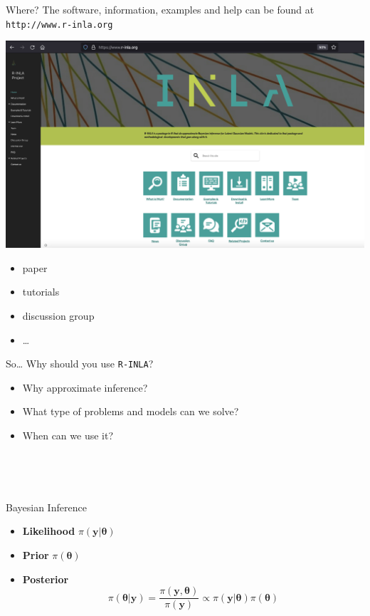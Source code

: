 \documentclass[
  ignorenonframetext,
]{beamer}
\providecommand{\tightlist}{%
  \setlength{\itemsep}{0pt}\setlength{\parskip}{0pt}}
\begin{document}
\begin{frame}[fragile]{Where?}
\protect\hypertarget{where}{}
The software, information, examples and help can be found at
\texttt{http://www.r-inla.org}

\begin{center}\includegraphics[width=0.5\linewidth]{graphics/rinla} \end{center}

\begin{itemize}
\tightlist
\item
  paper
\item
  tutorials
\item
  discussion group
\item
  \ldots{}
\end{itemize}
\end{frame}

\begin{frame}{So\ldots{} Why should you use \texttt{R-INLA}?}
\protect\hypertarget{so-why-should-you-use-r-inla}{}
\begin{itemize}
\tightlist
\item
  Why approximate inference?
\item
  What type of problems and models can we solve?
\item
  When can we use it?\\
  \strut \\
  \strut \\
\end{itemize}
\end{frame}

\begin{frame}{Bayesian Inference}
\protect\hypertarget{bayesian-inference}{}
\begin{itemize}
\item
  \textbf{Likelihood} \(\pi(\mathbf{y}|\mathbf{\theta})\)
\item
  \textbf{Prior} \(\pi(\mathbf{\theta})\)
\item
  \textbf{Posterior} \[
  \pi(\mathbf{\theta}|\mathbf{y}) = \frac{\pi(\mathbf{y},\mathbf{\theta}) }{\pi(\mathbf{y})}\propto \pi(\mathbf{y}|\mathbf{\theta})\pi(\mathbf{\theta})
  \]
\end{itemize}
\end{frame}
\end{document}
